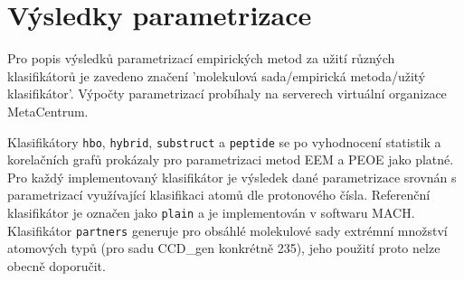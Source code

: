 \section{Výsledky parametrizace}
Pro popis výsledků parametrizací empirických metod za užití různých klasifikátorů je zavedeno značení 'molekulová sada/empirická metoda/užitý klasifikátor'. Výpočty  parametrizací probíhaly na serverech virtuální organizace MetaCentrum. 

Klasifikátory \verb|hbo|, \verb|hybrid|, \verb|substruct| a \verb|peptide| se po vyhodnocení statistik a korelačních grafů prokázaly pro parametrizaci metod EEM a PEOE jako platné. 
Pro každý implementovaný klasifikátor je výsledek dané parametrizace srovnán s parametrizací využívající klasifikaci atomů dle protonového čísla. Referenční klasifikátor je označen jako \verb|plain| a je implementován v softwaru MACH. Klasifikátor \verb|partners| generuje pro obsáhlé molekulové sady extrémní množství atomových typů (pro sadu CCD\_gen konkrétně 235), jeho použití proto nelze obecně doporučit. 


